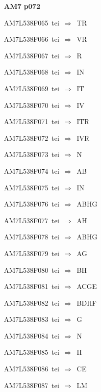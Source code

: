 \par\vfill\eject
{\bf\hfill AM7 p072\hfill\hbox{}}\par\bigskip
{\sixrm AM7L538F065\ {\sixit tei}\ }$\Rightarrow$\ TR\par\smallskip
{\sixrm AM7L538F066\ {\sixit tei}\ }$\Rightarrow$\ VR\par\smallskip
{\sixrm AM7L538F067\ {\sixit tei}\ }$\Rightarrow$\ R\par\smallskip
{\sixrm AM7L538F068\ {\sixit tei}\ }$\Rightarrow$\ IN\par\smallskip
{\sixrm AM7L538F069\ {\sixit tei}\ }$\Rightarrow$\ IT\par\smallskip
{\sixrm AM7L538F070\ {\sixit tei}\ }$\Rightarrow$\ IV\par\smallskip
{\sixrm AM7L538F071\ {\sixit tei}\ }$\Rightarrow$\ ITR\par\smallskip
{\sixrm AM7L538F072\ {\sixit tei}\ }$\Rightarrow$\ IVR\par\smallskip
{\sixrm AM7L538F073\ {\sixit tei}\ }$\Rightarrow$\ N\par\smallskip
{\sixrm AM7L538F074\ {\sixit tei}\ }$\Rightarrow$\ AB\par\smallskip
{\sixrm AM7L538F075\ {\sixit tei}\ }$\Rightarrow$\ IN\par\smallskip
{\sixrm AM7L538F076\ {\sixit tei}\ }$\Rightarrow$\ ABHG\par\smallskip
{\sixrm AM7L538F077\ {\sixit tei}\ }$\Rightarrow$\ AH\par\smallskip
{\sixrm AM7L538F078\ {\sixit tei}\ }$\Rightarrow$\ ABHG\par\smallskip
{\sixrm AM7L538F079\ {\sixit tei}\ }$\Rightarrow$\ AG\par\smallskip
{\sixrm AM7L538F080\ {\sixit tei}\ }$\Rightarrow$\ BH\par\smallskip
{\sixrm AM7L538F081\ {\sixit tei}\ }$\Rightarrow$\ ACGE\par\smallskip
{\sixrm AM7L538F082\ {\sixit tei}\ }$\Rightarrow$\ BDHF\par\smallskip
{\sixrm AM7L538F083\ {\sixit tei}\ }$\Rightarrow$\ G\par\smallskip
{\sixrm AM7L538F084\ {\sixit tei}\ }$\Rightarrow$\ N\par\smallskip
{\sixrm AM7L538F085\ {\sixit tei}\ }$\Rightarrow$\ H\par\smallskip
{\sixrm AM7L538F086\ {\sixit tei}\ }$\Rightarrow$\ CE\par\smallskip
{\sixrm AM7L538F087\ {\sixit tei}\ }$\Rightarrow$\ LM\par\smallskip
